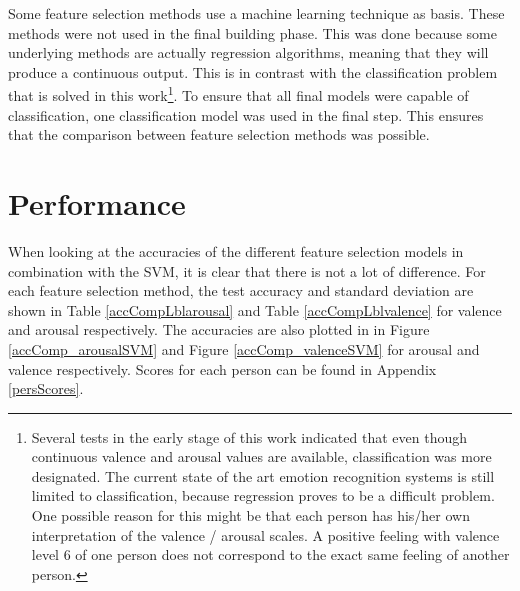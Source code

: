 Some feature selection methods use a machine learning technique as basis. These methods were not used in the final building phase. This was done because some underlying methods are actually regression algorithms, meaning that they will produce a continuous output. This is in contrast with the classification problem that is solved in this work\footnote{Several tests in the early stage of this work indicated that even though continuous valence and arousal values are available, classification was more designated. The current state of the art emotion recognition systems is still limited to classification, because regression proves to be a difficult problem. One possible reason for this might be that each person has his/her own interpretation of the valence / arousal scales. A positive feeling with valence level 6 of one person does not correspond to the exact same feeling of another person.}. To ensure that all final models were capable of classification, one classification model was used in the final step. This ensures that the comparison between feature selection methods was possible.

\section{Performance}

When looking at the accuracies of the different feature selection models in combination with the SVM, it is clear that there is not a lot of difference. For each feature selection method, the test accuracy and standard deviation are shown in Table \ref{accCompLblarousal} and Table \ref{accCompLblvalence} for valence and arousal respectively. The accuracies are also plotted in in Figure \ref{accComp_arousalSVM} and Figure \ref{accComp_valenceSVM} for arousal and valence respectively. Scores for each person can be found in Appendix \ref{persScores}.


